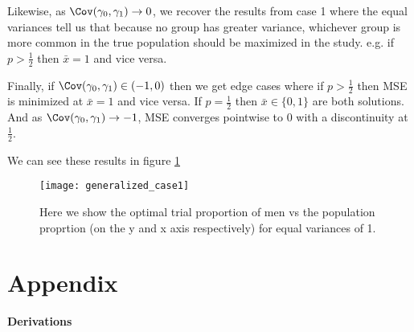 Likewise, as  $\Cov(\gamma_0, \gamma_1) \to 0$, we recover the results from case 1 where the equal variances tell us that because no group has greater variance, whichever group is more common in the true population should be maximized in the study.  e.g. if $p >  \frac{1}{2}$ then $\bar{x} = 1$ and vice versa.

Finally, if $\Cov(\gamma_0, \gamma_1) \in (-1,0)$ then we get edge cases where if $p > \frac{1}{2}$ then MSE is minimized at $\bar{x} = 1$ and vice versa. If $p=\frac{1}{2}$ then $\bar{x} \in \{0,1\}$ are both solutions. And as $\Cov(\gamma_0, \gamma_1) \to -1$, MSE converges pointwise to 0 with a discontinuity at $\frac{1}{2}$.

We can see these results in figure \ref{fig:generalized_case1}

\begin{figure}[ht!]
  \centering
	\texttt{[image: generalized\_case1]}
	\caption{Here we show the optimal trial proportion of men vs the population proprtion (on the y and x axis respectively) for equal variances of 1.} 
	\label{fig:generalized_case1}
\end{figure}


\section{Appendix}

\begin{center}
	{\large \bf Derivations }
\end{center}











